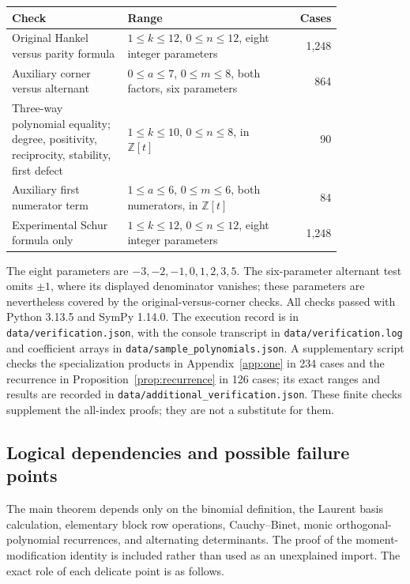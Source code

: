\documentclass[11pt]{article}
\theoremstyle{definition}
\theoremstyle{remark}
\newcommand{\Z}{\mathbb Z}
\theoremstyle{definition}
\theoremstyle{plain}
\numberwithin{equation}{section}
\begin{document}
\begin{center}
\small
\begin{tabular}{@{}p{0.35\linewidth}p{0.48\linewidth}r@{}}
\toprule
Check & Range & Cases\\
\midrule
Original Hankel versus parity formula &
$1\le k\le12$, $0\le n\le12$, eight integer parameters & 1,248\\[3pt]
Auxiliary corner versus alternant &
$0\le a\le7$, $0\le m\le8$, both factors, six parameters & 864\\[3pt]
Three-way polynomial equality; degree, positivity, reciprocity,
stability, first defect & $1\le k\le10$, $0\le n\le8$, in $\Z[t]$ & 90\\[3pt]
Auxiliary first numerator term &
$1\le a\le6$, $0\le m\le6$, both numerators, in $\Z[t]$ & 84\\[3pt]
Experimental Schur formula only &
$1\le k\le12$, $0\le n\le12$, eight integer parameters & 1,248\\
\bottomrule
\end{tabular}
\end{center}

The eight parameters are $-3,-2,-1,0,1,2,3,5$. The six-parameter
alternant test omits $\pm1$, where its displayed denominator vanishes;
these parameters are nevertheless covered by the original-versus-corner
checks. All checks passed with Python 3.13.5 and SymPy 1.14.0.
The execution record is in \texttt{data/verification.json}, with the
console transcript in \texttt{data/verification.log} and coefficient
arrays in \texttt{data/sample\_polynomials.json}. A supplementary script
checks the specialization products in Appendix~\ref{app:one} in 234 cases
and the recurrence in Proposition~\ref{prop:recurrence} in 126 cases; its
exact ranges and results are recorded in
\texttt{data/additional\_verification.json}.
These finite checks supplement the all-index proofs; they are not a
substitute for them.

\subsection{Logical dependencies and possible failure points}
The main theorem depends only on the binomial definition, the Laurent
basis calculation, elementary block row operations, Cauchy--Binet,
monic orthogonal-polynomial recurrences, and alternating determinants.
The proof of the moment-modification identity is included rather than
used as an unexplained import. The exact role of each delicate point is
as follows.
\end{document}
